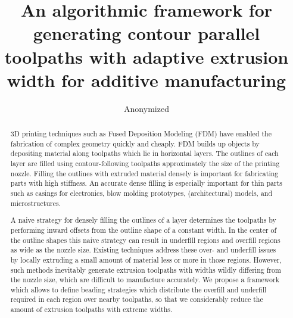 \documentclass[preprint,5p,twocolumn,times]{elsarticle}
\theoremstyle{definition}
\begin{document}
\baselineskip11pt %

\begin{frontmatter} %

\title{An algorithmic framework for generating contour parallel toolpaths with adaptive extrusion width for additive manufacturing}

\author{Anonymized}

\iffalse
\author[um,tud]{Tim Kuipers}
\author[tud]{Eugeni L. Doubrovski}
\author[tud]{Jun Wu}
\author[cuhk]{Charlie Wang{\corref{cor1}}}
\ead{cwang@mae.cuhk.edu.hk}
\cortext[cor1]{Corresponding author}
\address[um]{Ultimaker, Utrecht, The Netherlands}
\address[tud]{Department of Design Engineering, Delft University of Technology, The Netherlands}
\address[cuhk]{Department of Mechanical and Automation Engineering, The Chinese University of Hong Kong, Hong Kong SAR, China}
\fi

\begin{abstract}
3D printing techniques such as Fused Deposition Modeling (FDM) have enabled the fabrication of complex geometry quickly and cheaply. 
FDM builds up objects by depositing material along toolpaths which lie in horizontal layers.
The outlines of each layer are filled using contour-following toolpaths approximately the size of the printing nozzle.
Filling the outlines with extruded material densely is important for fabricating parts with high stiffness.
An accurate dense filling is especially important for thin parts such as casings for electronics, blow molding prototypes, (architectural) models, and microstructures.

A naive strategy for densely filling the outlines of a layer determines the toolpaths by performing inward offsets from the outline shape of a constant width.
In the center of the outline shapes this naive strategy can result in underfill regions and overfill regions as wide as the nozzle size.
Existing techniques address these over- and underfill issues by locally extruding a small amount of material less or more in those regions.
However, such methods inevitably generate extrusion toolpaths with widths wildly differing from the nozzle size, which are difficult to manufacture accurately.
We propose a framework which allows to define beading strategies which distribute the overfill and underfill required in each region over nearby toolpaths, so that we considerably reduce the amount of extrusion toolpaths with extreme widths.


\end{abstract}
\end{frontmatter}
\end{document}
